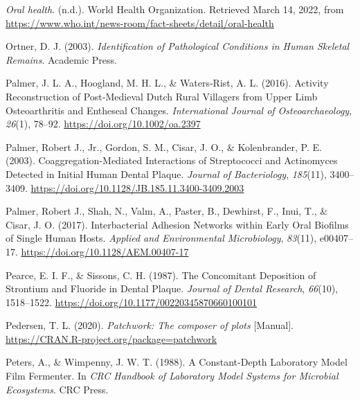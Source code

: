 \documentclass[
  letterpaper,
]{book}
\newlength{\cslhangindent}
\newlength{\cslentryspacingunit} %
\newenvironment{CSLReferences}[2] %
 {%
  \setlength{\parindent}{0pt}
  \ifodd #1
  \let\oldpar\par
  \def\par{\hangindent=\cslhangindent\oldpar}
  \fi
  \setlength{\parskip}{#2\cslentryspacingunit}
 }%
 {}
\begin{document}
\begin{CSLReferences}{1}{0}
\leavevmode{}%
\emph{Oral health}. (n.d.). {World Health Organization}. Retrieved March
14, 2022, from
\url{https://www.who.int/news-room/fact-sheets/detail/oral-health}

\leavevmode{}%
Ortner, D. J. (2003). \emph{Identification of {Pathological Conditions}
in {Human Skeletal Remains}}. {Academic Press}.

\leavevmode{}%
Palmer, J. L. A., Hoogland, M. H. L., \& Waters‐Rist, A. L. (2016).
Activity {Reconstruction} of {Post}‐{Medieval Dutch Rural Villagers}
from {Upper Limb Osteoarthritis} and {Entheseal Changes}.
\emph{International Journal of Osteoarchaeology}, \emph{26}(1), 78--92.
\url{https://doi.org/10.1002/oa.2397}

\leavevmode{}%
Palmer, Robert J., Jr., Gordon, S. M., Cisar, J. O., \& Kolenbrander, P.
E. (2003). Coaggregation-{Mediated Interactions} of {Streptococci} and
{Actinomyces Detected} in {Initial Human Dental Plaque}. \emph{Journal
of Bacteriology}, \emph{185}(11), 3400--3409.
\url{https://doi.org/10.1128/JB.185.11.3400-3409.2003}

\leavevmode{}%
Palmer, Robert J., Shah, N., Valm, A., Paster, B., Dewhirst, F., Inui,
T., \& Cisar, J. O. (2017). Interbacterial {Adhesion Networks} within
{Early Oral Biofilms} of {Single Human Hosts}. \emph{Applied and
Environmental Microbiology}, \emph{83}(11), e00407--17.
\url{https://doi.org/10.1128/AEM.00407-17}

\leavevmode{}%
Pearce, E. I. F., \& Sissons, C. H. (1987). The {Concomitant Deposition}
of {Strontium} and {Fluoride} in {Dental Plaque}. \emph{Journal of
Dental Research}, \emph{66}(10), 1518--1522.
\url{https://doi.org/10.1177/00220345870660100101}

\leavevmode{}%
Pedersen, T. L. (2020). \emph{Patchwork: {The} composer of plots}
{[}Manual{]}. \url{https://CRAN.R-project.org/package=patchwork}

\leavevmode{}%
Peters, A., \& Wimpenny, J. W. T. (1988). A {Constant-Depth Laboratory
Model Film Fermenter}. In \emph{{CRC Handbook} of {Laboratory Model
Systems} for {Microbial Ecosystems}}. {CRC Press}.


\end{CSLReferences}
\end{document}

